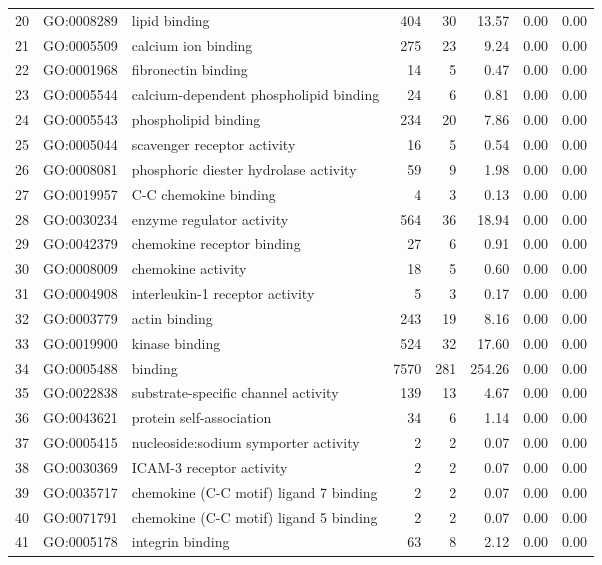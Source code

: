 \begin{table}[ht]
\begin{tabular}{rllrrrrr}
  20 & GO:0008289 & lipid binding & 404 &  30 & 13.57 & 0.00 & 0.00 \\ 
  21 & GO:0005509 & calcium ion binding & 275 &  23 & 9.24 & 0.00 & 0.00 \\ 
  22 & GO:0001968 & fibronectin binding &  14 &   5 & 0.47 & 0.00 & 0.00 \\ 
  23 & GO:0005544 & calcium-dependent phospholipid binding &  24 &   6 & 0.81 & 0.00 & 0.00 \\ 
  24 & GO:0005543 & phospholipid binding & 234 &  20 & 7.86 & 0.00 & 0.00 \\ 
  25 & GO:0005044 & scavenger receptor activity &  16 &   5 & 0.54 & 0.00 & 0.00 \\ 
  26 & GO:0008081 & phosphoric diester hydrolase activity &  59 &   9 & 1.98 & 0.00 & 0.00 \\ 
  27 & GO:0019957 & C-C chemokine binding &   4 &   3 & 0.13 & 0.00 & 0.00 \\ 
  28 & GO:0030234 & enzyme regulator activity & 564 &  36 & 18.94 & 0.00 & 0.00 \\ 
  29 & GO:0042379 & chemokine receptor binding &  27 &   6 & 0.91 & 0.00 & 0.00 \\ 
  30 & GO:0008009 & chemokine activity &  18 &   5 & 0.60 & 0.00 & 0.00 \\ 
  31 & GO:0004908 & interleukin-1 receptor activity &   5 &   3 & 0.17 & 0.00 & 0.00 \\ 
  32 & GO:0003779 & actin binding & 243 &  19 & 8.16 & 0.00 & 0.00 \\ 
  33 & GO:0019900 & kinase binding & 524 &  32 & 17.60 & 0.00 & 0.00 \\ 
  34 & GO:0005488 & binding & 7570 & 281 & 254.26 & 0.00 & 0.00 \\ 
  35 & GO:0022838 & substrate-specific channel activity & 139 &  13 & 4.67 & 0.00 & 0.00 \\ 
  36 & GO:0043621 & protein self-association &  34 &   6 & 1.14 & 0.00 & 0.00 \\ 
  37 & GO:0005415 & nucleoside:sodium symporter activity &   2 &   2 & 0.07 & 0.00 & 0.00 \\ 
  38 & GO:0030369 & ICAM-3 receptor activity &   2 &   2 & 0.07 & 0.00 & 0.00 \\ 
  39 & GO:0035717 & chemokine (C-C motif) ligand 7 binding &   2 &   2 & 0.07 & 0.00 & 0.00 \\ 
  40 & GO:0071791 & chemokine (C-C motif) ligand 5 binding &   2 &   2 & 0.07 & 0.00 & 0.00 \\ 
  41 & GO:0005178 & integrin binding &  63 &   8 & 2.12 & 0.00 & 0.00 \\ 

\end{tabular}
\end{table}
